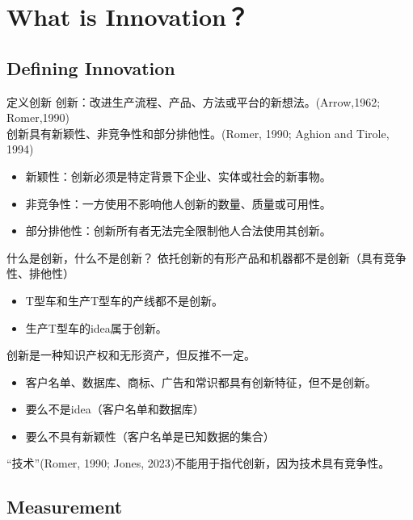 \documentclass{beamer}
\begin{document}
\section{What is Innovation？}

\subsection{Defining Innovation}

\begin{frame}{定义创新}
	创新：\alert{改进生产流程、产品、方法或平台的新想法。}(Arrow,1962; Romer,1990)\\
	创新具有\alert{新颖性、非竞争性和部分排他性}。(Romer, 1990; Aghion and Tirole, 1994)
	\begin{itemize}
		\item 新颖性：创新必须是特定背景下企业、实体或社会的新事物。
		\item 非竞争性：一方使用不影响他人创新的数量、质量或可用性。
		\item 部分排他性：创新所有者无法完全限制他人合法使用其创新。
	\end{itemize}
\end{frame}

\begin{frame}{什么是创新，什么不是创新？}
	依托创新的有形产品和机器都不是创新（具有竞争性、排他性）
	\begin{itemize}
		\item[] T型车和生产T型车的产线都不是创新。
		\item[] 生产T型车的idea属于创新。
	\end{itemize}
	创新是一种知识产权和无形资产，但反推不一定。
	\begin{itemize}
		\item[] 客户名单、数据库、商标、广告和常识都具有创新特征，但不是创新。
		\item[] 要么不是idea（客户名单和数据库）
		\item[] 要么不具有新颖性（客户名单是已知数据的集合）
	\end{itemize}
	“技术”(Romer, 1990; Jones, 2023)不能用于指代创新，因为技术具有竞争性。
\end{frame}

\subsection{Measurement}
\end{document}

